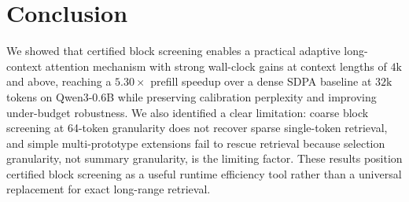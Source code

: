 \documentclass[11pt]{article}
\theoremstyle{plain}
\theoremstyle{definition}
\begin{document}
\section{Conclusion}

We showed that certified block screening enables a practical adaptive
long-context attention mechanism with strong wall-clock gains at context
lengths of $4\mathrm{k}$ and above, reaching a $5.30\times$ prefill
speedup over a dense SDPA \citep{dao2022flashattention} baseline at
$32\mathrm{k}$ tokens on Qwen3-0.6B \citep{qwen3} while preserving
calibration perplexity and improving under-budget robustness. We also
identified a clear limitation: coarse block screening at 64-token
granularity does not recover sparse single-token retrieval, and simple
multi-prototype extensions fail to rescue retrieval because selection
granularity, not summary granularity, is the limiting factor. These
results position certified block screening as a useful runtime efficiency
tool rather than a universal replacement for exact long-range retrieval.



\end{document}
